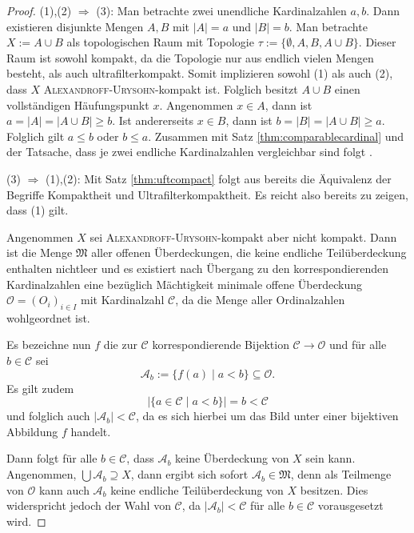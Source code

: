 \begin{proof}
  (1),(2) $\Rightarrow$ (3):
  Man betrachte zwei unendliche Kardinalzahlen $a,b$.
  Dann existieren disjunkte Mengen $A,B$ mit $|A| = a$ und $|B| = b$.
  Man betrachte $X := A \cup B$ als topologischen Raum mit Topologie $\tau := \{\emptyset, A, B, A \cup B\}$.
  Dieser Raum ist sowohl kompakt, da die Topologie nur aus endlich vielen Mengen besteht, als auch ultrafilterkompakt. 
  Somit implizieren sowohl (1) als auch (2), dass $X$ \textsc{Alexandroff}-\textsc{Urysohn}-kompakt ist.
  Folglich besitzt $A \cup B$ einen vollständigen Häufungspunkt $x$.
  Angenommen $x \in A$, dann ist $a = |A| = |A \cup B| \geq b$. 
  Ist andererseits $x \in B$, dann ist $b = |B| = |A \cup B| \geq a$.
  Folglich gilt $a \leq b$ oder $b \leq a$.
  Zusammen mit Satz \ref{thm:comparablecardinal} und der Tatsache, dass je zwei endliche Kardinalzahlen vergleichbar sind folgt \AC.

  (3) $\Rightarrow$ (1),(2):
  Mit Satz \ref{thm:uftcompact} folgt aus \UFT bereits die Äquivalenz der Begriffe Kompaktheit und Ultrafilterkompaktheit.
  Es reicht also bereits zu zeigen, dass (1) gilt.

  Angenommen $X$ sei \textsc{Alexandroff}-\textsc{Urysohn}-kompakt aber nicht kompakt.
  Dann ist die Menge $\mathfrak{M}$ aller offenen Überdeckungen, die keine endliche Teilüberdeckung enthalten nichtleer und es existiert nach Übergang zu den korrespondierenden Kardinalzahlen eine bezüglich Mächtigkeit minimale offene Überdeckung $\mathcal{O} = (O_i)_{i \in I}$ mit Kardinalzahl $\mathcal{C}$, da die Menge aller Ordinalzahlen wohlgeordnet ist.

  Es bezeichne nun $f$ die zur $\mathcal{C}$ korrespondierende Bijektion $\mathcal{C} \to \mathcal{O}$ und für alle $b \in \mathcal{C}$ sei 
  \begin{displaymath}
    \mathcal{A}_b := \{ f(a) \mid a < b\} \subseteq \mathcal{O}.
  \end{displaymath}
  Es gilt zudem
  \begin{displaymath}
    | \{ a \in \mathcal{C} \mid a < b \} | = b < \mathcal{C}
  \end{displaymath}
  und folglich auch $| \mathcal{A}_b | < \mathcal{C}$, da es sich hierbei um das Bild unter einer bijektiven Abbildung $f$ handelt.

  Dann folgt für alle $b \in \mathcal{C}$, dass $\mathcal{A}_b$ keine Überdeckung von $X$ sein kann.
  Angenommen, $\bigcup \mathcal{A}_b \supseteq X$, dann ergibt sich sofort $\mathcal{A}_b \in \mathfrak{M}$, denn als Teilmenge von $\mathcal{O}$ kann auch $\mathcal{A}_b$ keine endliche Teilüberdeckung von $X$ besitzen.
  Dies widerspricht jedoch der Wahl von $\mathcal{C}$, da $|\mathcal{A}_b| < \mathcal{C}$ für alle $b \in \mathcal{C}$ vorausgesetzt wird.


\end{proof}
